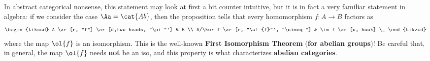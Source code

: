 \begin{rmk}
    In abstract categorical nonsense, this statement
    may look at first a bit counter intuitive,
    but it is in fact a very familiar statement in algebra:
    if we consider the case $\Aa = \cat{Ab}$, then
    the proposition tells that every homomorphism $f:A \to B$
    factors as
    \begin{equation*}
        \begin{tikzcd}
             A \ar[r, "f"] \ar[d,two heads, "\pi"'] 
            & B \\
            A/\ker f \ar[r, "\ol{f}"', "\simeq"] 
            & \im f \ar[u, hook] \,,
        \end{tikzcd}
        \end{equation*}
    where the map $\ol{f}$ is an isomorphism.
    This is the well-known 
    \textbf{First Isomorphism Theorem} (\textbf{for abelian groups})!
    Be careful that, in general, the map $\ol{f}$ needs \textbf{not}
    be an iso, and this property is what characterizes 
    \textbf{abelian categories}.
\end{rmk}